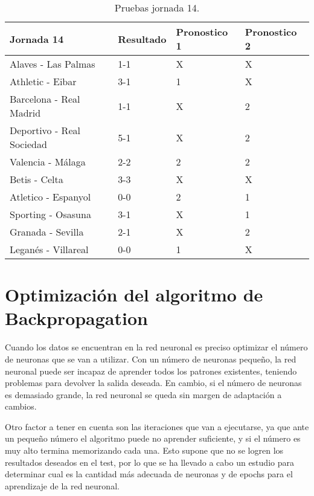   \begin{table}
  \begin{center}
   \begin{tabular}{|p{5cm} | p{2.5cm} |p{2.5cm} |p{2.5cm} |}
    \hline
   	Jornada 14 & Resultado & Pronostico 1 & Pronostico 2\\
    \hline
    Alaves - Las Palmas & 1-1 & \cellcolor{green}X & \cellcolor{green}X\\
    \hline
    Athletic - Eibar & 3-1 & \cellcolor{green}1 & \cellcolor{red}X\\
    \hline
    Barcelona - Real Madrid & 1-1 & \cellcolor{green}X & \cellcolor{red}2\\
    \hline
    Deportivo - Real Sociedad & 5-1 & \cellcolor{red}X & \cellcolor{red}2\\
    \hline
    Valencia - Málaga & 2-2 & \cellcolor{red}2 & \cellcolor{red}2\\
    \hline
    Betis - Celta & 3-3 & \cellcolor{green}X & \cellcolor{green}X\\
    \hline
    Atletico - Espanyol & 0-0 & \cellcolor{red}2 & \cellcolor{green}1\\
    \hline
    Sporting - Osasuna & 3-1 & \cellcolor{red}X & \cellcolor{green}1\\
    \hline
	Granada - Sevilla & 2-1 & \cellcolor{red}X & \cellcolor{red}2\\
    \hline
    Leganés - Villareal & 0-0 & \cellcolor{red}1 & \cellcolor{green}X\\
    \hline
   \end{tabular}
   \caption{Pruebas jornada 14.}
   \label{tabla:jornada14}
  \end{center}
 \end{table} 

\section{Optimización del algoritmo de Backpropagation}
Cuando los datos se encuentran en la red neuronal es preciso optimizar el número de neuronas que se van a utilizar. Con un número de neuronas pequeño, la red neuronal puede ser incapaz de aprender todos los patrones existentes, teniendo problemas para devolver la salida deseada. En cambio, si el número de neuronas es demasiado grande, la red neuronal se queda sin margen de adaptación a cambios.

Otro factor a tener en cuenta son las iteraciones que van a ejecutarse, ya que ante un pequeño número el algoritmo puede no aprender suficiente, y si el número es muy alto termina memorizando cada una. Esto supone que no se logren los resultados deseados en el test, por lo que se ha llevado a cabo un estudio para determinar cual es la cantidad más adecuada de neuronas y de epochs para el aprendizaje de la red neuronal.

